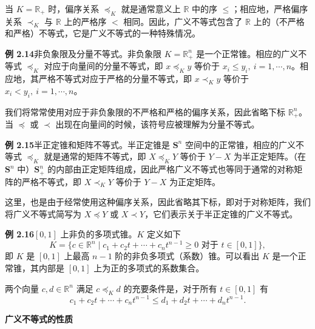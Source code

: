 \documentclass[UTF8,12pt,a4paper,fontset=fandol]{ctexart}
\begin{document}
当 $K=\mathbb{R}_+$ 时，偏序关系 $\preceq_K$ 就是通常意义上 $\mathbb{R}$ 中的序 $\le$；相应地，严格偏序关系 $\prec_K$ 与 $\mathbb{R}$ 上的严格序 $<$ 相同。因此，广义不等式包含了 $\mathbb{R}$ 上的（不严格和严格）不等式，它是广义不等式的一种特殊情况。

\noindent\textbf{例 2.14}\quad 非负象限及分量不等式。非负象限 $K=\mathbb{R}_+^n$ 是一个正常锥。相应的广义不等式 $\preceq_K$ 对应于向量间的分量不等式，即 $x\preceq_K y$ 等价于 $x_i\le y_i,\ i=1,\cdots,n$。相应地，其严格不等式对应于严格的分量不等式，即 $x\prec_K y$ 等价于 $x_i<y_i,\ i=1,\cdots,n$。

我们将常常使用对应于非负象限的不严格和严格的偏序关系，因此省略下标 $\mathbb{R}_+^n$。当 $\preceq$ 或 $\prec$ 出现在向量间的时候，该符号应被理解为分量不等式。

\noindent\textbf{例 2.15}\quad 半正定锥和矩阵不等式。半正定锥是 $\mathbf{S}^n$ 空间中的正常锥，相应的广义不等式 $\preceq_K$ 就是通常的矩阵不等式，即 $X\preceq_KY$ 等价于 $Y-X$ 为半正定矩阵。（在 $\mathbf{S}^n$ 中）$\mathbf{S}_+^n$ 的内部由正定矩阵组成，因此严格广义不等式也等同于通常的对称矩阵的严格不等式，即 $X\prec_KY$ 等价于 $Y-X$ 为正定矩阵。

这里，也是由于经常使用这种偏序关系，因此省略其下标，即对于对称矩阵，我们将广义不等式简写为 $X\preceq Y$ 或 $X\prec Y$，它们表示关于半正定锥的广义不等式。

\noindent\textbf{例 2.16}\quad $[0,1]$ 上非负的多项式锥。$K$ 定义如下
\begin{equation}
  K=\{c\in\mathbb{R}^n\mid c_1+c_2t+\cdots+c_nt^{n-1}\ge 0\text{ 对于 }t\in[0,1]\},
  \tag{2.15}
\end{equation}
即 $K$ 是 $[0,1]$ 上最高 $n-1$ 阶的非负多项式（系数）锥。可以看出 $K$ 是一个正常锥，其内部是 $[0,1]$ 上为正的多项式的系数集合。

两个向量 $c,d\in\mathbb{R}^n$ 满足 $c\preceq_K d$ 的充要条件是，对于所有 $t\in[0,1]$ 有
\[
  c_1+c_2t+\cdots+c_nt^{n-1}
  \le d_1+d_2t+\cdots+d_nt^{n-1}.
\]

\noindent\textbf{广义不等式的性质}
\end{document}
